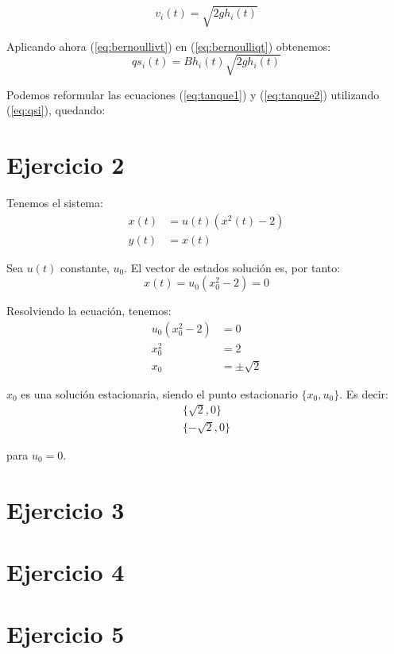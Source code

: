 \documentclass[12pt]{article}
\begin{document}
\begin{equation}
    \label{eq:bernoullivt}
    {v_i(t) = \sqrt{2 g h_i(t)}}
\end{equation}

Aplicando ahora (\ref{eq:bernoullivt}) en (\ref{eq:bernoulliqt}) obtenemos:
\begin{equation}
    \label{eq:qsi}
    {qs_i(t) = B h_i(t) \sqrt{2 g h_i(t)}}
\end{equation}

Podemos reformular las ecuaciones (\ref{eq:tanque1}) y (\ref{eq:tanque2}) utilizando (\ref{eq:qsi}), quedando:
\begin{equation}
    {}
\end{equation}

\newpage

\section{Ejercicio 2}
Tenemos el sistema:
\begin{align*}
x(t) &= u(t) (x^2(t) - 2) \\
y(t) &= x(t)
\end{align*}

Sea $u(t)$ constante, $u_0$. El vector de estados solución es, por tanto:
\begin{equation*}
    x(t) = u_0 (x_0^2 - 2) = 0
\end{equation*}

Resolviendo la ecuación, tenemos:
\begin{align*}
    u_0 (x_0^2 - 2) &= 0\\
    x_0^2 &= 2\\
    x_0 &= \pm \sqrt{2}
\end{align*}

$x_0$ es una solución estacionaria, siendo el punto estacionario $\{x_0, u_0\}$. Es decir:
\begin{align*}
    \{\sqrt{2}, 0\}\\
    \{-\sqrt{2}, 0\}
\end{align*}

para $u_0 = 0$.
\newpage

\section{Ejercicio 3}
\newpage

\section{Ejercicio 4}
\newpage

\section{Ejercicio 5}
\end{document}
